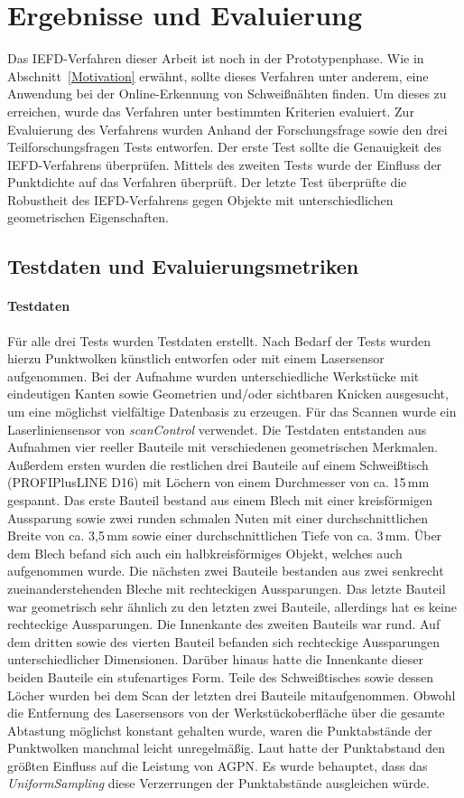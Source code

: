 \chapter{Ergebnisse und Evaluierung}
Das IEFD-Verfahren dieser Arbeit ist noch in der Prototypenphase. Wie in Abschnitt~\ref{Motivation} erwähnt, sollte dieses Verfahren unter anderem, eine Anwendung bei der Online-Erkennung von Schweißnähten finden. Um dieses zu erreichen, wurde das Verfahren unter bestimmten Kriterien evaluiert. Zur Evaluierung des Verfahrens wurden Anhand der Forschungsfrage sowie den drei Teilforschungsfragen Tests entworfen. Der erste Test sollte die Genauigkeit des IEFD-Verfahrens überprüfen. Mittels des zweiten Tests wurde der Einfluss der Punktdichte auf das Verfahren überprüft. Der letzte Test überprüfte die Robustheit des IEFD-Verfahrens gegen Objekte mit unterschiedlichen geometrischen Eigenschaften.

\section{Testdaten und Evaluierungsmetriken}
\subsubsection{Testdaten}\label{test_data}
Für alle drei Tests wurden Testdaten erstellt. Nach Bedarf der Tests wurden hierzu Punktwolken künstlich entworfen oder mit einem Lasersensor aufgenommen. Bei der Aufnahme wurden unterschiedliche Werkstücke mit eindeutigen Kanten sowie Geometrien und/oder sichtbaren Knicken ausgesucht, um eine möglichst vielfältige Datenbasis zu erzeugen. Für das Scannen wurde ein Laserliniensensor von \textit{scanControl} verwendet. Die Testdaten entstanden aus Aufnahmen vier reeller Bauteile mit verschiedenen geometrischen Merkmalen. Außerdem ersten wurden die restlichen drei Bauteile auf einem Schweißtisch (PROFIPlusLINE D16) mit Löchern von einem Durchmesser von ca. 15\,mm gespannt. Das erste Bauteil bestand aus einem Blech mit einer kreisförmigen Aussparung sowie zwei runden schmalen Nuten mit einer durchschnittlichen Breite von ca. 3,5\,mm sowie einer durchschnittlichen Tiefe von ca. 3\,mm. Über dem Blech befand sich auch ein halbkreisförmiges Objekt, welches auch aufgenommen wurde. Die nächsten zwei Bauteile bestanden aus zwei senkrecht zueinanderstehenden Bleche mit rechteckigen Aussparungen. Das letzte Bauteil war geometrisch sehr ähnlich zu den letzten zwei Bauteile, allerdings hat es keine rechteckige Aussparungen. Die Innenkante des zweiten Bauteils war rund. Auf dem dritten sowie des vierten Bauteil befanden sich rechteckige Aussparungen unterschiedlicher Dimensionen. Darüber hinaus hatte die Innenkante dieser beiden Bauteile ein stufenartiges Form. Teile des Schweißtisches sowie dessen Löcher wurden bei dem Scan der letzten drei Bauteile mitaufgenommen. Obwohl die Entfernung des Lasersensors von der Werkstückoberfläche über die gesamte Abtastung möglichst konstant gehalten wurde, waren die Punktabstände der Punktwolken manchmal leicht unregelmäßig. Laut \textcite[9]{ni_edge_2016} hatte der Punktabstand den größten Einfluss auf die Leistung von AGPN. Es wurde behauptet, dass das \textit{UniformSampling} diese Verzerrungen der Punktabstände ausgleichen würde. 

